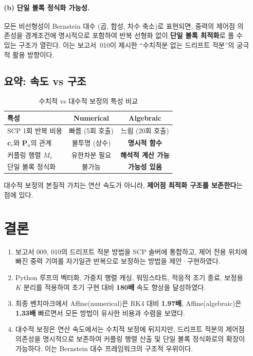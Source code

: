 \documentclass[11pt]{article}
\begin{document}
\paragraph{(b) 단일 볼록 정식화 가능성.}
모든 비선형성이 Bernstein 대수 (곱, 합성, 차수 축소)로 표현되면,
중력의 제어점 의존성을 경계조건에 명시적으로 포함하여
반복 선형화 없이 \textbf{단일 볼록 최적화}로 풀 수 있는 구조가 열린다.
이는 보고서~010\cite{report010}이 제시한 ``수치적분 없는 드리프트 적분''의
궁극적 활용 방향이다.

\subsection{요약: 속도 vs 구조}

\begin{table}[h]
\centering
\caption{수치적 vs 대수적 보정의 특성 비교}
\label{tab:num_vs_alg}
\begin{tabular}{lcc}
\toprule
특성 & Numerical & Algebraic \\
\midrule
SCP 1회 반복 비용        & 빠름 (5회 호출) & 느림 (20회 호출) \\
$\mathbf{c}_v$와 $\mathbf{P}_u$의 관계 & 불투명 (상수) & \textbf{명시적 함수} \\
커플링 행렬 $M_v$        & 유한차분 필요    & \textbf{해석적 계산 가능} \\
단일 볼록 정식화          & 불가능          & \textbf{가능성 있음} \\
\bottomrule
\end{tabular}
\end{table}

대수적 보정의 본질적 가치는 연산 속도가 아니라,
\textbf{제어점 최적화 구조를 보존한다}는 점에 있다.


\section{결론}

\begin{enumerate}
  \item 보고서 009, 010의 드리프트 적분 방법을 SCP 솔버에 통합하고,
        제어 전용 위치에 빠진 중력 기여를 자기일관 반복으로 보정하는
        방법을 제안·구현하였다.

  \item Python 루프의 벡터화, 가중치 행렬 캐싱, 워밍스타트, 적응적 조기 종료,
        보정용 $K$ 분리를 적용하여
        초기 구현 대비 \textbf{180배} 속도 향상을 달성하였다.

  \item 최종 벤치마크에서 Affine(numerical)은 RK4 대비 \textbf{1.97배},
        Affine(algebraic)은 \textbf{1.33배} 빠르면서
        모든 방법이 유사한 비용과 수렴을 보였다.

  \item 대수적 보정은 연산 속도에서는 수치적 보정에 뒤지지만,
        드리프트 적분의 제어점 의존성을 명시적으로 보존하여
        커플링 행렬 산출 및 단일 볼록 정식화로의 확장이 가능하다.
        이는 Bernstein 대수 프레임워크의 구조적 우위이다.
\end{enumerate}




\end{document}
